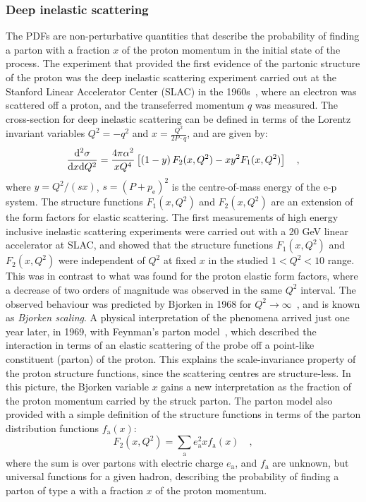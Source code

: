 \subsubsection{Deep inelastic scattering}
The PDFs are non-perturbative quantities that describe the probability of finding a parton with a fraction $x$ of the proton momentum in the initial state of the process. The experiment that provided the first evidence of the partonic structure of the proton was the deep inelastic scattering experiment carried out at the Stanford Linear Accelerator Center (SLAC) in the 1960s~\cite{Friedman:1972sy}, where an electron was scattered off a proton, and the transeferred momentum $q$ was measured. The cross-section for deep inelastic scattering can be defined in terms of the Lorentz invariant variables $Q^2 = -q^2$ and $x = \frac{Q^2}{2P\cdot q}$, and are given by:
\begin{equation*}
    \frac{\mathrm{d}^2\sigma}{\mathrm{d} x \mathrm{d} Q^2} = \frac{4\pi\alpha^2}{xQ^4} \left[ \left(1-y\right)F_2(x,Q^2) - xy^2F_1(x,Q^2) \right]\quad ,
\end{equation*}
where $y=Q^2/(sx)$, $s = (P+p_\mathrm{e})^2$ is the centre-of-mass energy of the e-p system. The structure functions $F_1(x,Q^2)$ and $F_2(x,Q^2)$ are an extension of the form factors for elastic scattering.
The first measurements of high energy inclusive inelastic scattering experiments were carried out with a 20 GeV linear accelerator at SLAC, and showed that the structure functions $F_1(x,Q^2)$ and $F_2(x,Q^2)$ were independent of $Q^2$ at fixed $x$ in the studied $1< Q^2 < 10$ \gevcc range. This was in contrast to what was found for the proton elastic form factors, where a decrease of two orders of magnitude was observed in the same $Q^2$ interval. The observed behaviour was predicted by Bjorken in 1968 for $Q^2 \rightarrow \infty$~\cite{Bjorken:1968dy}, and is known as \emph{Bjorken scaling}. A physical interpretation of the phenomena arrived just one year later, in 1969, with Feynman's parton model~\cite{Feynman:1969ej}, which described the interaction in terms of an elastic scattering of the probe off a point-like constituent (parton) of the proton. This explains the scale-invariance property of the proton structure functions, since the scattering centres are structure-less. In this picture, the Bjorken variable $x$ gains a new interpretation as the fraction of the proton momentum carried by the struck parton. The parton model also provided with a simple definition of the structure functions in terms of the parton distribution functions $f_\mathrm{a}(x)$:
\begin{equation*}
    F_2(x,Q^2) = \sum_\mathrm{a} e_\mathrm{a}^2 x f_\mathrm{a}(x)\quad ,
\end{equation*}
where the sum is over partons with electric charge $e_\mathrm{a}$, and $f_\mathrm{a}$ are unknown, but universal functions for a given hadron, describing the probability of finding a parton of type a with a fraction $x$ of the proton momentum. 

